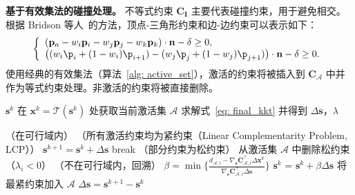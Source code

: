 \noindent\textbf{基于有效集法的碰撞处理。}
\label{app:active_set}
不等式约束 $\mathbf{C_I}$ 主要代表碰撞约束，用于避免相交。根据 Bridson 等人~\cite{bridson2002robust}的方法，顶点-三角形约束和边-边约束可以表示如下：
\begin{equation}
   \left\{
   \begin{array}{l}
   (\mathbf p_a-w_i \mathbf p_i - w_j \mathbf p_j - w_k \mathbf p_k ) \cdot \mathbf{n} -\delta \geq 0,\\
   \left( (w_i \p_i + (1 - w_i) \p_{i+1}) - (w_j \p_j + (1
  - w_j) \p_{j+1}) \right) \cdot \mathbf{n} - \delta \geq 0.
   \end{array}
 \right.
 \label{eq:collision_constraint}
\end{equation}
使用经典的有效集法（算法~\ref{alg: active_set}），激活的约束将被插入到 $\mathbf{C_{\mathcal A}}$ 中并作为等式约束处理。非激活的约束将被直接删除。
\begin{algorithm}
\caption{有效集法}\label{alg: active_set}
\begin{algorithmic}
\REQUIRE ${\mathbf{s}}^k$
\STATE 在 $\mathbf{x}^k = \mathcal{T}\left( {\mathbf{s}}^k   \right)$ 处获取当前激活集 $\mathcal{A}$
    \STATE 求解式~\eqref{eq: final_kkt} 并得到 $\Delta {\mathbf{s}}$，$\lambda$

     \STATE （在可行域内）
       \STATE （所有激活约束均为紧约束（Linear Complementarity Problem, LCP））
      \STATE ${\mathbf{s}}^{k+1} = {\mathbf{s}}^k + \Delta {\mathbf{s}}$
      \STATE break
      \ELSE \STATE （部分约束为松约束）
      \STATE 从激活集 $\mathcal{A}$ 中删除松约束（$\lambda_i < 0$）
      \ENDIF
      \ELSE \STATE （不在可行域内，回溯）
      \STATE $\beta = \min \{ \frac{d_{\mathcal{A}, i} - \nabla_{\mathbf{s}} \mathbf{C}_{\mathcal{A}, i} ^\top \Delta \mathbf{x}^k}{\nabla_{\mathbf{s}} \mathbf{C}_{\mathcal{A}, i} ^\top \Delta \mathbf{s}}\}$
      \STATE ${\mathbf{s}}^k$ = ${\mathbf{s}}^k + \beta \Delta {\mathbf{s}}$
      \STATE 将最紧约束加入 $\mathcal{A}$
    \ENDIF
\ENDWHILE
\STATE $\Delta {\mathbf{s}} = {\mathbf{s}}^{k+1} - {\mathbf{s}}^k$
\end{algorithmic}
\end{algorithm}